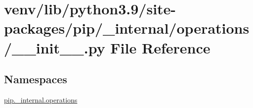 \hypertarget{venv_2lib_2python3_89_2site-packages_2pip_2__internal_2operations_2____init_____8py}{}\section{venv/lib/python3.9/site-\/packages/pip/\+\_\+internal/operations/\+\_\+\+\_\+init\+\_\+\+\_\+.py File Reference}
\label{venv_2lib_2python3_89_2site-packages_2pip_2__internal_2operations_2____init_____8py}
\subsection*{Namespaces}
\begin{DoxyCompactItemize}
\item 
 \hyperlink{namespacepip_1_1__internal_1_1operations}{pip.\+\_\+internal.\+operations}
\end{DoxyCompactItemize}
